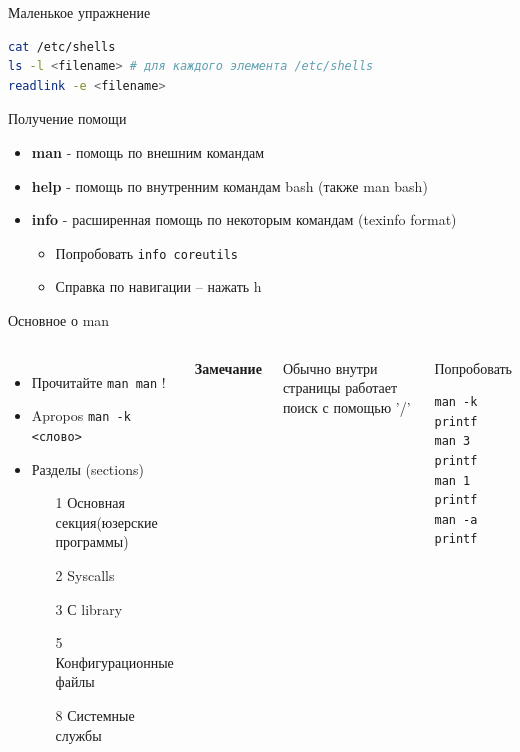 \documentclass[ignorenonframetext, professionalfonts, hyperref={pdftex, unicode}]{beamer}
\begin{document}
\begin{frame}[fragile]{Маленькое упражнение}
\begin{lstlisting}[language=bash]
cat /etc/shells
ls -l <filename> # для каждого элемента /etc/shells
readlink -e <filename> 
\end{lstlisting}
\end{frame}
\begin{frame}[fragile]{Получение помощи}
  \begin{itemize}
    \pause
    \item \textbf{man} - помощь по внешним командам
    \pause
    \item \textbf{help} - помощь по внутренним командам bash (также man bash)
    \pause
    \item \textbf{info} - расширенная помощь по некоторым командам (texinfo format)
      \begin{itemize}
       \item   Попробовать {\tt info coreutils}
       \item   Справка по навигации -- нажать h
      \end{itemize}
  \end{itemize}
\end{frame}
\begin{frame}[fragile]{Основное о man}
\begin{columns}
  \column{2.2in}
  \begin{itemize}
        \item Прочитайте {\tt man man} !
        \item Apropos {\tt man -k <слово>}
        \item Разделы (sections)
          \begin{itemize}
            \item[1] Основная секция(юзерские программы) 
            \item[2] Syscalls
            \item[3] С library
            \item[5] Конфигурационные файлы
            \item[8] Системные службы
          \end{itemize}
  \end{itemize}
  \textbf{Замечание}

  Обычно внутри страницы работает поиск с помощью '/'
 \pause 
 \column{1in}
 \begin{block}{Попробовать}
\begin{lstlisting}
man -k printf
man 3 printf
man 1 printf
man -a printf
\end{lstlisting}
\end{block}
\end{columns}
\end{frame}
\end{document}
